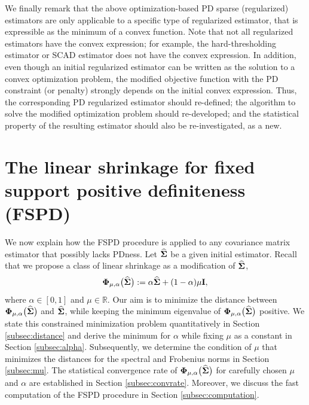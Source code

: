\documentclass[times,sort&compress,3p]{elsarticle}
\newcommand{\NN}{\nonumber}
\begin{document}
We finally remark that the above optimization-based PD sparse (regularized) estimators
are only applicable to a specific type of regularized estimator, that is expressible as the 
minimum of a convex function.
Note that not all regularized estimators have the convex expression; for example, the hard-thresholding 
estimator or SCAD estimator does not have the convex expression. In addition, even though an initial
regularized estimator can be written as the solution to a convex optimization problem, the modified objective 
function with the PD constraint (or penalty) strongly depends on the initial convex expression. Thus, the corresponding
PD regularized 
estimator should re-defined; the algorithm to solve the modified optimization problem should re-developed; 
and the statistical property of the resulting estimator should also be re-investigated, as a new. 



\section{The linear shrinkage for fixed support positive definiteness (FSPD)}\label{sec:FSPD}

We now explain how the FSPD procedure is applied to any covariance matrix estimator that possibly lacks PDness. Let $\widehat{\bf \Sigma}$ be a given initial estimator. Recall that we propose a class of linear shrinkage as a modification of $\widehat{\bf \Sigma}$,
\begin{equation}  \NN
{\bf \Phi}_{\mu, \alpha}\big(\widehat{\bf \Sigma}\big) := \alpha \widehat{\bf \Sigma} + (1 - \alpha) \mu {\bf I},
\end{equation}
where $\alpha \in [0,1]$ and $\mu \in \mathbb{R}$.
%
Our aim is to minimize the distance between
 ${\bf \Phi}_{\mu, \alpha}\big(\widehat{\bf \Sigma}\big)$ and $\widehat{\bf \Sigma}$, while
keeping the minimum eigenvalue of ${\bf \Phi}_{\mu, \alpha}\big(\widehat{\bf \Sigma}\big)$ 
positive. We state this constrained minimization problem quantitatively in Section \ref{subsec:distance} and derive the minimum for $\alpha$ while fixing $\mu$ as a constant in Section \ref{subsec:alpha}. Subsequently, we determine the condition of $\mu$ that minimizes the distances for the spectral and Frobenius norms in Section \ref{subsec:mu}. The statistical convergence rate of ${\bf \Phi}_{\mu, \alpha}\big(\widehat{\bf \Sigma}\big)$ for carefully chosen $\mu$ and $\alpha$ are established in Section \ref{subsec:convrate}. Moreover, we discuss 
the fast computation of the FSPD procedure in Section
\ref{subsec:computation}.
\end{document}

